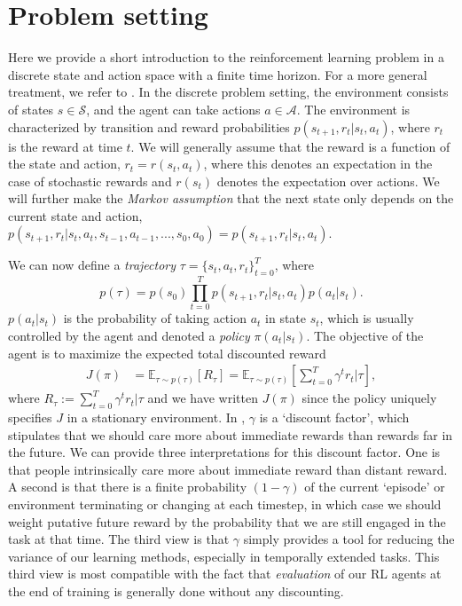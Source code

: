 \section{Problem setting}
\label{sec:problem_setting}

Here we provide a short introduction to the reinforcement learning problem in a discrete state and action space with a finite time horizon.
For a more general treatment, we refer to \citet{sutton2018reinforcement}.
In the discrete problem setting, the environment consists of states $s \in \mathcal{S}$, and the agent can take actions $a \in \mathcal{A}$.
The environment is characterized by transition and reward probabilities $p(s_{t+1}, r_t | s_t, a_t)$, where $r_t$ is the reward at time $t$.
We will generally assume that the reward is a function of the state and action, $r_t = r(s_t, a_t)$, where this denotes an expectation in the case of stochastic rewards and $r(s_t)$ denotes the expectation over actions.
We will further make the \emph{Markov assumption} that the next state only depends on the current state and action, $p(s_{t+1}, r_t | s_t, a_t, s_{t-1}, a_{t-1}, ..., s_0, a_0) = p(s_{t+1}, r_t | s_t, a_t)$.

We can now define a \emph{trajectory} $\tau = \{ s_t, a_t, r_t \}_{t = 0}^T$, where
\begin{equation}
    p(\tau) = p(s_0) \prod_{t = 0}^T p(s_{t+1}, r_t | s_t, a_t) p(a_t|s_t).
\end{equation}
$p(a_t|s_t)$ is the probability of taking action $a_t$ in state $s_t$, which is usually controlled by the agent and denoted a \emph{policy} $\pi(a_t|s_t)$.
The objective of the agent is to maximize the expected total discounted reward
\begin{align}
    \label{eq:RL_objective}
    J(\pi) &= \mathbb{E}_{\tau \sim p(\tau)} \left [ R_\tau \right ] = \mathbb{E}_{\tau \sim p(\tau)} \left [ \sum_{t=0}^T \gamma^t r_t | \tau \right ],
\end{align}
where $R_\tau := \sum_{t=0}^T \gamma^t r_t | \tau$ and we have written $J(\pi)$ since the policy uniquely specifies $J$ in a stationary environment.
In , $\gamma$ is a `discount factor', which stipulates that we should care more about immediate rewards than rewards far in the future.
We can provide three interpretations for this discount factor.
One is that people intrinsically care more about immediate reward than distant reward.
A second is that there is a finite probability $(1-\gamma)$ of the current `episode' or environment terminating or changing at each timestep, in which case we should weight putative future reward by the probability that we are still engaged in the task at that time.
The third view is that $\gamma$ simply provides a tool for reducing the variance of our learning methods, especially in temporally extended tasks.
This third view is most compatible with the fact that \emph{evaluation} of our RL agents at the end of training is generally done without any discounting.

